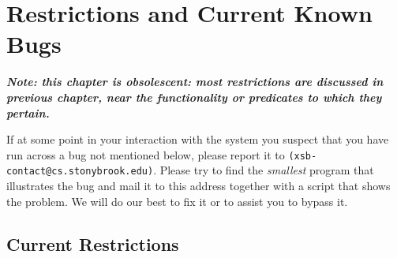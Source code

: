 \chapter{Restrictions and Current Known Bugs}

{\bf {\em Note: this chapter is obsolescent: most restrictions are
    discussed in previous chapter, near the functionality or
    predicates to which they pertain.}}

If at some point in your interaction with the system you suspect that
you have run across a bug not mentioned below, please report it to
{\tt (xsb-contact@cs.stonybrook.edu)}.  Please try to find the {\em
smallest} program that illustrates the bug and mail it to this address
together with a script that shows the problem.  We will do our best to
fix it or to assist you to bypass it.

\section{Current Restrictions}
\label{sec:CurrentRestrictions}

